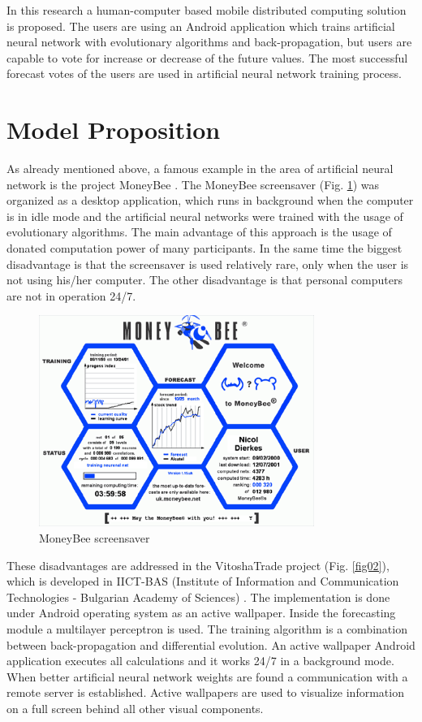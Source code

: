 \documentclass[runningheads]{llncs}
\begin{document}
In this research a human-computer based mobile distributed computing solution is proposed. The users are using an Android application which trains artificial neural network with evolutionary algorithms and back-propagation, but users are capable to vote for increase or decrease of the future values. The most successful forecast votes of the users are used in artificial neural network training process. 

\section{Model Proposition} \label{Model Proposition}

As already mentioned above, a famous example in the area of artificial neural network is the project MoneyBee \cite{bohn01}. The MoneyBee screensaver (Fig. \ref{fig01}) was organized as a desktop application, which runs in background when the computer is in idle mode and the artificial neural networks were trained with the usage of evolutionary algorithms. The main advantage of this approach is the usage of donated computation power of many participants. In the same time the biggest disadvantage is that the screensaver is used relatively rare, only when the user is not using his/her computer. The other disadvantage is that personal computers are not in operation 24/7.

\begin{figure}
\includegraphics[width=0.8\textwidth]{fig01.png}
\centering
\caption{MoneyBee screensaver} \label{fig01}
\end{figure}
\FloatBarrier

These disadvantages are addressed in the VitoshaTrade project (Fig. \ref{fig02}), which is developed in IICT-BAS (Institute of Information and Communication Technologies - Bulgarian Academy of Sciences) \cite{balabanov01}. The implementation is done under Android operating system as an active wallpaper. Inside the forecasting module a multilayer perceptron is used. The training algorithm is a combination between back-propagation and differential evolution. An active wallpaper Android application executes all calculations and it works 24/7 in a background mode. When better artificial neural network weights are found a communication with a remote server is established. Active wallpapers are used to visualize information on a full screen behind all other visual components. 
\end{document}
